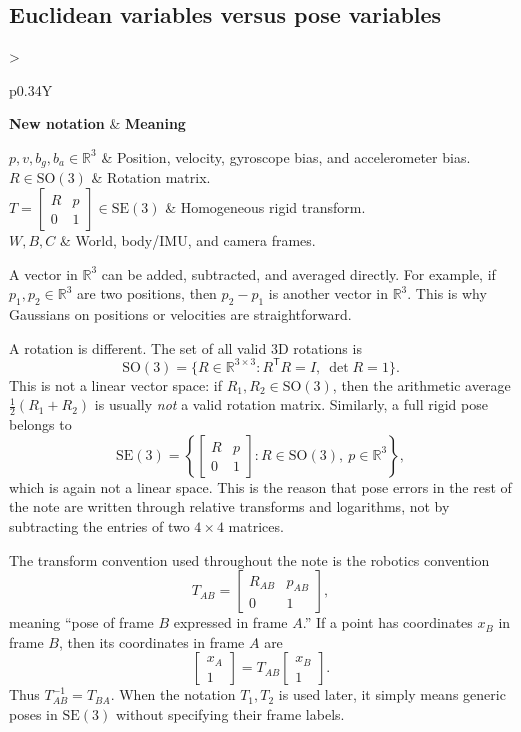 \documentclass[11pt]{report}
\newcommand{\SO}{\mathrm{SO}(3)}
\newcommand{\SE}{\mathrm{SE}(3)}
\newcommand{\R}{\mathbb{R}}
\newcommand{\tran}{^{\mathsf T}}
\newcommand{\NotationTable}[1]{%
\vspace{0.6mm}
{\scriptsize
\setlength{\tabcolsep}{2.5pt}
\begin{tabularx}{\columnwidth}{>{\raggedright\arraybackslash}p{0.34\columnwidth}Y}
\toprule
\textbf{New notation} & \textbf{Meaning}\\
\midrule
#1\\
\bottomrule
\end{tabularx}}
\vspace{0.8mm}}
\begin{document}
\subsection{Euclidean variables versus pose variables}
\NotationTable{
$p,v,b_g,b_a\in\R^3$ & Position, velocity, gyroscope bias, and accelerometer bias.\\
$R\in\SO$ & Rotation matrix.\\
$T=\begin{bmatrix}R&p\\0&1\end{bmatrix}\in\SE$ & Homogeneous rigid transform.\\
$W,B,C$ & World, body/IMU, and camera frames.}

A vector in $\R^3$ can be added, subtracted, and averaged directly. For example, if $p_1,p_2\in\R^3$ are two positions, then $p_2-p_1$ is another vector in $\R^3$. This is why Gaussians on positions or velocities are straightforward.

A rotation is different. The set of all valid 3D rotations is
\begin{equation}
\SO=\{R\in\R^{3\times 3}:R\tran R=I,\ \det R=1\}.
\end{equation}
This is not a linear vector space: if $R_1,R_2\in\SO$, then the arithmetic average $\tfrac12(R_1+R_2)$ is usually \emph{not} a valid rotation matrix. Similarly, a full rigid pose belongs to
\begin{equation}
\SE=\left\{\begin{bmatrix}R&p\\0&1\end{bmatrix}:R\in\SO,\ p\in\R^3\right\},
\end{equation}
which is again not a linear space. This is the reason that pose errors in the rest of the note are written through relative transforms and logarithms, not by subtracting the entries of two $4\times4$ matrices.

The transform convention used throughout the note is the robotics convention
\begin{equation}
T_{AB}=\begin{bmatrix}R_{AB}&p_{AB}\\0&1\end{bmatrix},
\end{equation}
meaning ``pose of frame $B$ expressed in frame $A$.'' If a point has coordinates $x_B$ in frame $B$, then its coordinates in frame $A$ are
\begin{equation}
\begin{bmatrix}x_A\\1\end{bmatrix}=T_{AB}\begin{bmatrix}x_B\\1\end{bmatrix}.
\end{equation}
Thus $T_{AB}^{-1}=T_{BA}$. When the notation $T_1,T_2$ is used later, it simply means generic poses in $\SE$ without specifying their frame labels.
\end{document}
